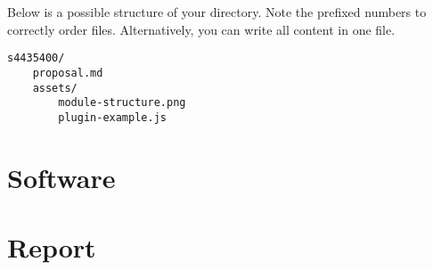 \documentclass{csse4400}
\begin{document}
\noindent
Below is a possible structure of your directory. Note the prefixed numbers to correctly order files.
Alternatively, you can write all content in one file.

\begin{verbatim}
s4435400/
    proposal.md
    assets/
        module-structure.png
        plugin-example.js
\end{verbatim}

\section{Software}

\section{Report}
\end{document}

